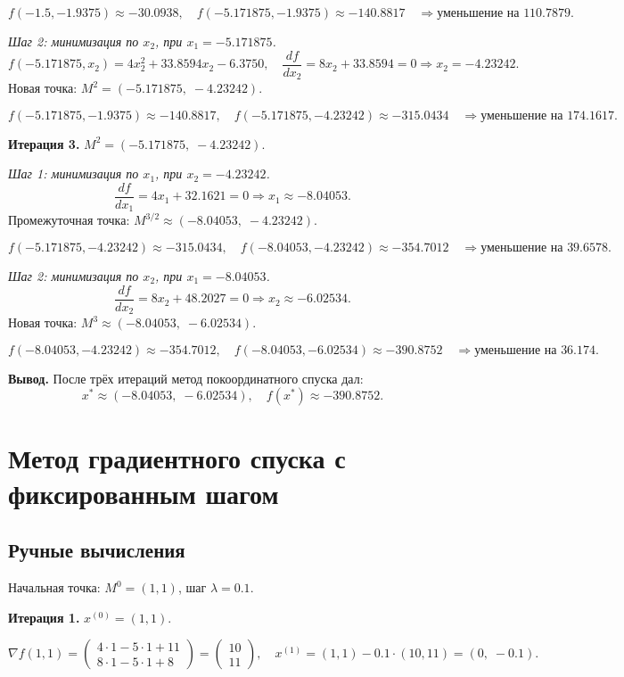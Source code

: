 \documentclass{article}
\begin{document}
\[
f(-1.5,-1.9375) \approx -30.0938,\quad f(-5.171875,-1.9375) \approx -140.8817 \quad \Rightarrow \text{уменьшение на } 110.7879.
\]

\medskip
\emph{Шаг 2: минимизация по $x_2$, при $x_1 = -5.171875$.}
\[
f(-5.171875,x_2) = 4x_2^2 + 33.8594x_2 - 6.3750, \quad \frac{df}{dx_2} = 8x_2 + 33.8594 = 0 \Rightarrow x_2 = -4.23242.
\]
Новая точка: $M^2 = (-5.171875,\;-4.23242)$.

\[
f(-5.171875,-1.9375) \approx -140.8817,\quad f(-5.171875,-4.23242) \approx -315.0434 \quad \Rightarrow \text{уменьшение на } 174.1617.
\]

\bigskip
\textbf{Итерация 3.} $M^2 = (-5.171875,\;-4.23242)$.

\medskip
\emph{Шаг 1: минимизация по $x_1$, при $x_2 = -4.23242$.}
\[
\frac{df}{dx_1} = 4x_1 + 32.1621 = 0 \Rightarrow x_1 \approx -8.04053.
\]
Промежуточная точка: $M^{3/2} \approx (-8.04053,\;-4.23242)$.

\[
f(-5.171875,-4.23242) \approx -315.0434,\quad f(-8.04053,-4.23242) \approx -354.7012 \quad \Rightarrow \text{уменьшение на } 39.6578.
\]

\medskip
\emph{Шаг 2: минимизация по $x_2$, при $x_1 = -8.04053$.}
\[
\frac{df}{dx_2} = 8x_2 + 48.2027 = 0 \Rightarrow x_2 \approx -6.02534.
\]
Новая точка: $M^3 \approx (-8.04053,\;-6.02534)$.

\[
f(-8.04053,-4.23242) \approx -354.7012,\quad f(-8.04053,-6.02534) \approx -390.8752 \quad \Rightarrow \text{уменьшение на } 36.174.
\]

\bigskip
\textbf{Вывод.} После трёх итераций метод покоординатного спуска дал:
\[
x^* \approx (-8.04053,\;-6.02534),\quad f(x^*) \approx -390.8752.
\]

\section{Метод градиентного спуска с фиксированным шагом}
\subsection{Ручные вычисления}

Начальная точка: $M^0 = (1,1)$, шаг $\lambda = 0.1$.

\medskip
\textbf{Итерация 1.} $x^{(0)} = (1,1)$.

\[
\nabla f(1,1) =
\begin{pmatrix}
4\cdot1 - 5\cdot1 + 11\\
8\cdot1 - 5\cdot1 + 8
\end{pmatrix}
=
\begin{pmatrix}
10\\
11
\end{pmatrix},
\quad
x^{(1)} = (1,1) - 0.1\cdot(10,11) = (0,\;-0.1).
\]
\end{document}
